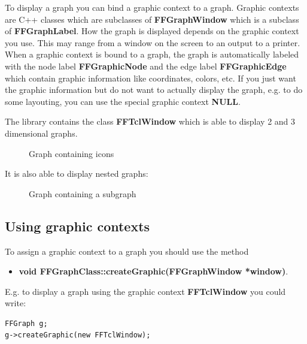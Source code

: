 To display a graph you can bind a graphic context to a graph.
Graphic contexts are C++ classes which are subclasses of {\bf
  FFGraphWindow} which is a subclass of {\bf FFGraphLabel}. How
the graph is displayed depends on the graphic context you use.
This may range from a window on the screen to an output to a
printer. When a graphic context is bound to a graph, the graph is
automatically labeled with the node label {\bf FFGraphicNode} and
the edge label {\bf FFGraphicEdge} which contain graphic
information like coordinates, colors, etc. If you just want the
graphic information but do not want to actually display the graph,
e.g. to do some layouting, you can use the special graphic
context {\bf NULL}.

The library contains the class {\bf FFTclWindow} which is able to
display 2 and 3 dimensional graphs. 

\begin{figure}[htb]
\caption{Graph containing icons}
\end{figure}

It is also able to display nested graphs:

\clearpage

\begin{figure}[H]
\hspace*{-3cm}
\caption{Graph containing a subgraph}
\end{figure}
\clearpage
\subsection{Using graphic contexts} 
\label{using_graphic}


To assign a graphic context to a graph you should use the method \\

\begin{itemize}
\item{\bf void FFGraphClass::createGraphic(FFGraphWindow *window)}. \\
\end{itemize}

E.g. to display a graph using the graphic context {\bf FFTclWindow} you 
could write: 

\bigskip

\begin{verbatim}
FFGraph g;
g->createGraphic(new FFTclWindow);
\end{verbatim}

\bigskip

